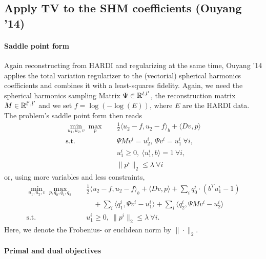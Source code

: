 
\subsection{Apply TV to the SHM coefficients (Ouyang '14)}

\paragraph{Saddle point form}

Again reconstructing from HARDI and regularizing at the same time, Ouyang '14
applies the total variation regularizer to the (vectorial) spherical harmonics
coefficients and combines it with a least-squares fidelity.
Again, we need the spherical harmonics sampling Matrix $\Psi \in \mathbb{R}^{l,l'}$,
the reconstruction matrix $M \in \mathbb{R}^{l',l'}$ and we set $f = \log(-\log(E))$,
where $E$ are the HARDI data.
The problem's saddle point form then reads
\begin{align*}
    \min_{u_1,u_2,v} \max_{p} \quad
        & \frac{1}{2} \langle u_2 - f, u_2 - f \rangle_b + \langle Dv, p \rangle \\
    \text{s.t.}\quad 
        & \Psi M v^i = u_2^i, ~\Psi v^i = u_1^i ~\forall i, \\
        & u_1^i \geq 0, ~\langle u_1^i, b \rangle = 1 ~\forall i, \\
        & \|p^{i}\|_{2} \leq \lambda ~\forall i
\end{align*}
or, using more variables and less constraints,
\begin{align*}
    \min_{u_1,u_2,v} \max_{p,q_0,q_1,q_2} \quad
        & \frac{1}{2} \langle u_2 - f, u_2 - f \rangle_b
            + \langle Dv, p \rangle
            + \sum_{i} q_0^i \cdot (b^T u_1^i - 1) \\
        &\quad + \sum_{i} \langle q_1^i, \Psi v^i - u_1^i \rangle
            + \sum_{i} \langle q_2^i, \Psi M v^i - u_2^i \rangle \\
    \text{s.t.}\quad 
        & u_1^i \geq 0, ~\|p^{i}\|_{2} \leq \lambda ~\forall i.
\end{align*}
Here, we denote the Frobenius- or euclidean norm by $\|\cdot\|_{2}$.

\paragraph{Primal and dual objectives}

